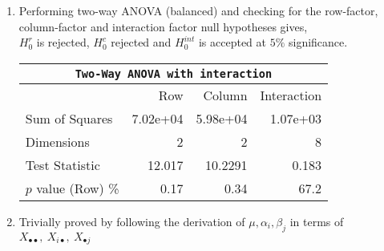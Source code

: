 \begin{enumerate}
\begin{table}[H]
		\bigskip
	\end{table}
	
	\item Performing two-way ANOVA (balanced) and checking for the row-factor, column-factor and interaction factor null hypotheses gives,\\
	$ H_0^r $ is rejected, $ H_0^c $ rejected and $ H_0^{int} $ is accepted at $ 5\% $ significance.\\

	\begin{table}[H]
		\centering
		\begin{tabular}{@{}lrrr@{}}
			\toprule
			\multicolumn{4}{c}{\texttt{Two-Way ANOVA with interaction}}\\ 
			\midrule
			{} &       Row &    Column & Interaction \\
			\midrule
			Sum of Squares     &  7.02e+04 &  5.98e+04 &    1.07e+03 \\
			Dimensions         &         2 &         2 &           8 \\
			Test Statistic     &    12.017 &   10.2291 &       0.183 \\
			$p$ value (Row) \% &      0.17 &      0.34 &        67.2 \\
			\bottomrule
		\end{tabular}
		
		\bigskip
	\end{table}

	\item Trivially proved by following the derivation of $ \mu, \alpha_i, \beta_j $ in terms of $ X_{\bullet 
	\bullet},\ X_{i \bullet},\ X_{\bullet j} $\\
\end{enumerate}

